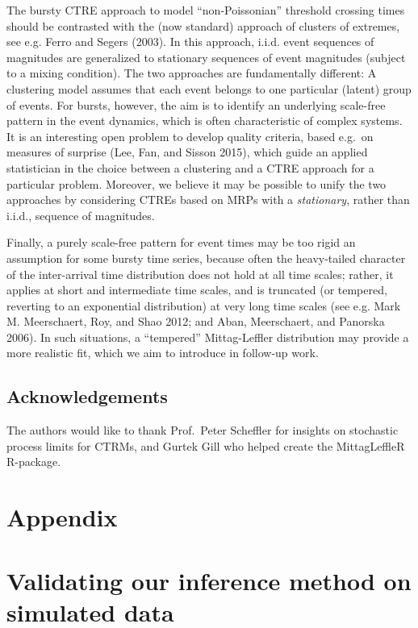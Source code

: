 \documentclass[smallextended]{svjour3}       %
\begin{document}
The bursty CTRE approach to model ``non-Poissonian'' threshold crossing
times should be contrasted with the (now standard) approach of clusters
of extremes, see e.g. Ferro and Segers (2003). In this approach, i.i.d.
event sequences of magnitudes are generalized to stationary sequences of
event magnitudes (subject to a mixing condition). The two approaches are
fundamentally different: A clustering model assumes that each event
belongs to one particular (latent) group of events. For bursts, however,
the aim is to identify an underlying scale-free pattern in the event
dynamics, which is often characteristic of complex systems. It is an
interesting open problem to develop quality criteria, based e.g.~on
measures of surprise (Lee, Fan, and Sisson 2015), which guide an applied
statistician in the choice between a clustering and a CTRE approach for
a particular problem. Moreover, we believe it may be possible to unify
the two approaches by considering CTREs based on MRPs with a
\emph{stationary}, rather than i.i.d., sequence of magnitudes.

Finally, a purely scale-free pattern for event times may be too rigid an
assumption for some bursty time series, because often the heavy-tailed
character of the inter-arrival time distribution does not hold at all
time scales; rather, it applies at short and intermediate time scales,
and is truncated (or tempered, reverting to an exponential distribution)
at very long time scales (see e.g. Mark M. Meerschaert, Roy, and Shao
2012; and Aban, Meerschaert, and Panorska 2006). In such situations, a
``tempered'' Mittag-Leffler distribution may provide a more realistic
fit, which we aim to introduce in follow-up work.

\subsection*{Acknowledgements}\label{acknowledgements}

The authors would like to thank Prof.~Peter Scheffler for insights on
stochastic process limits for CTRMs, and Gurtek Gill who helped create
the MittagLeffleR R-package.
\newpage 

\section*{Appendix}

\appendix

\section{Validating our inference method on simulated
data}\label{validating-our-inference-method-on-simulated-data}
\end{document}
